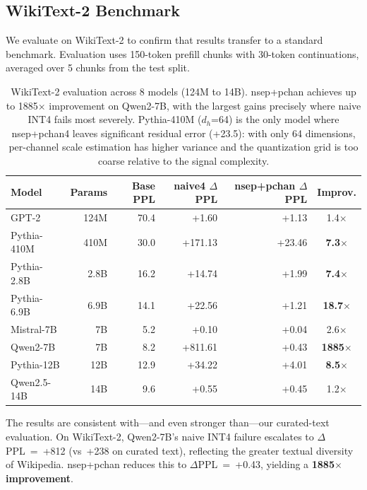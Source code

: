\documentclass[11pt]{article}
\begin{document}
\subsection{WikiText-2 Benchmark}

We evaluate on WikiText-2 \citep{merity2017pointer} to confirm that results transfer to a standard benchmark. Evaluation uses 150-token prefill chunks with 30-token continuations, averaged over 5 chunks from the test split.

\begin{table}[t]
\centering
\small
\begin{tabular}{lrrrrc}
\toprule
Model & Params & Base PPL & naive4 $\Delta$PPL & nsep+pchan $\Delta$PPL & Improv. \\
\midrule
GPT-2 & 124M & 70.4 & +1.60 & +1.13 & 1.4$\times$ \\
Pythia-410M & 410M & 30.0 & +171.13 & +23.46 & \textbf{7.3$\times$} \\
Pythia-2.8B & 2.8B & 16.2 & +14.74 & +1.99 & \textbf{7.4$\times$} \\
Pythia-6.9B & 6.9B & 14.1 & +22.56 & +1.21 & \textbf{18.7$\times$} \\
Mistral-7B & 7B & 5.2 & +0.10 & +0.04 & 2.6$\times$ \\
Qwen2-7B & 7B & 8.2 & +811.61 & +0.43 & \textbf{1885$\times$} \\
Pythia-12B & 12B & 12.9 & +34.22 & +4.01 & \textbf{8.5$\times$} \\
Qwen2.5-14B & 14B & 9.6 & +0.55 & +0.45 & 1.2$\times$ \\
\bottomrule
\end{tabular}
\caption{WikiText-2 evaluation across 8 models (124M to 14B). nsep+pchan achieves up to 1885$\times$ improvement on Qwen2-7B, with the largest gains precisely where naive INT4 fails most severely. Pythia-410M ($d_h$=64) is the only model where nsep+pchan4 leaves significant residual error (+23.5): with only 64 dimensions, per-channel scale estimation has higher variance and the quantization grid is too coarse relative to the signal complexity.}
\label{tab:wikitext}
\end{table}

The results are consistent with---and even stronger than---our curated-text evaluation. On WikiText-2, Qwen2-7B's naive INT4 failure escalates to $\Delta$PPL~=~+812 (vs~+238 on curated text), reflecting the greater textual diversity of Wikipedia. nsep+pchan reduces this to $\Delta$PPL~=~+0.43, yielding a \textbf{1885$\times$ improvement}.
\end{document}
